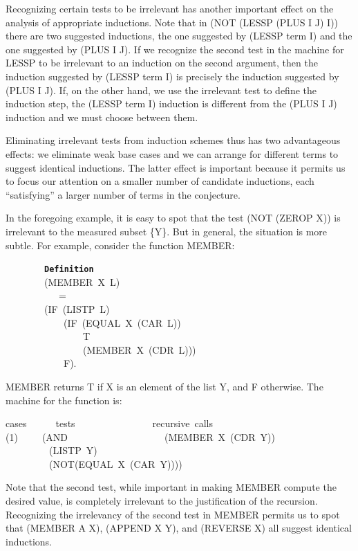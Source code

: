 \documentclass[11pt]{book}
\newenvironment{pubasis}{\begin{flushleft}\ttfamily\small}{\normalsize\rmfamily\end{flushleft}}
\newcommand{\axiomordefinition}[1]{\vspace{6pt}\texttt{\textbf{#1}}}
\begin{document}
Recognizing certain tests to be irrelevant has another important
effect on the analysis of appropriate inductions.
Note that in (NOT (LESSP (PLUS I J) I)) there are two suggested
inductions, the one suggested by (LESSP term I) and the one
suggested by (PLUS I J).  If we recognize the second test in the
machine for LESSP to be irrelevant to an induction on the
second argument, then the induction suggested by (LESSP term I)
is precisely the induction suggested by (PLUS I J).  If, on the
other hand, we use the irrelevant test to define the induction
step, the (LESSP term I) induction is different from the (PLUS I J)
induction and we must choose between them.

Eliminating irrelevant tests from induction schemes thus
has two advantageous effects:  we eliminate weak base cases and
we can arrange for different terms to suggest identical inductions.
The latter effect is important because it permits us to focus our
attention on a smaller number of candidate inductions, each
``satisfying'' a larger number of terms in the conjecture.

In the foregoing example, it is easy to spot that the test (NOT (ZEROP X))
is irrelevant to the measured subset \{Y\}.  But in general, the
situation is more subtle.  For example, consider the function MEMBER:
\begin{pubasis}
~~~~~~~~\axiomordefinition{Definition}\\
~~~~~~~~(MEMBER~X~L)\\
~~~~~~~~~~~=\\
~~~~~~~~(IF~(LISTP~L)\\
~~~~~~~~~~~~(IF~(EQUAL~X~(CAR~L))\\
~~~~~~~~~~~~~~~~T\\
~~~~~~~~~~~~~~~~(MEMBER~X~(CDR~L)))\\
~~~~~~~~~~~~F).\\
\end{pubasis}
MEMBER returns T if X is an element of the list Y, and F otherwise.
The machine for the function is:
\begin{pubasis}
cases~~~~~~tests~~~~~~~~~~~~~~~~recursive~calls\\

(1)~~~~~(AND~~~~~~~~~~~~~~~~~~~~(MEMBER~X~(CDR~Y))\\
~~~~~~~~~(LISTP~Y)\\
~~~~~~~~~(NOT(EQUAL~X~(CAR~Y))))\\
\end{pubasis}
Note that the second test, while important in making MEMBER compute
the desired value, is completely irrelevant to the justification of the
recursion.  Recognizing the irrelevancy of the second test in MEMBER
permits us to spot that (MEMBER A X), (APPEND X Y), and (REVERSE X)
all suggest identical inductions.
\end{document}
